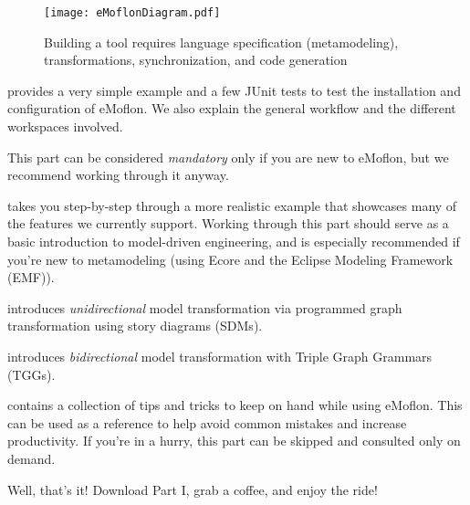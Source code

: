 \begin{figure}[htbp]
	\centering
  \texttt{[image: eMoflonDiagram.pdf]}
	\caption{Building a tool requires language specification (metamodeling), transformations, synchronization, and code generation}
	\label{fig:transformationModel}
\end{figure}
\begin{description}

\pagebreak

\item[\Cref{chap:installation}: Installation and set up] provides a very simple example and a few JUnit tests to test the installation and configuration of eMoflon.
We also explain the general workflow and the different workspaces involved.

This part can be considered \emph{mandatory} only if you are new to eMoflon, but we recommend working through it anyway.

\item[\Cref{chap:ecore}: Ecore] takes you step-by-step through a more realistic example that showcases many of the features we currently support.
Working through this part should serve as a basic introduction to model-driven engineering, and is especially recommended if you're new to metamodeling
(using Ecore and the Eclipse Modeling Framework (EMF)).


\item[\Cref{chap:sdm}: Story Driven Modelling (SDM)] introduces \emph{unidirectional} model transformation via programmed graph transformation using story diagrams (SDMs).


\item[\Cref{chap:Learning-Box-to-Dictionary-and-Back-Again}: TGGs] introduces \emph{bidirectional} model transformation with Triple Graph Grammars (TGGs).


\item[\Cref{chap:misc}: Miscellaneous] contains a collection of tips and tricks to keep
on hand while using eMoflon. This can be used as a reference to help avoid common mistakes and increase productivity. If you're in a hurry, this part can be skipped and consulted only on demand.

\end{description}

Well, that's it! Download Part I, grab a coffee, and enjoy the ride!
